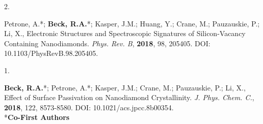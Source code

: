\begin{cvpublications}



\cvpublication
{2.}
{\parbox[t]{0.95\textwidth}{\strut Petrone, A.*; \textbf{Beck, R.A.}*; Kasper, J.M.; Huang, Y.; Crane, M.; Pauzauskie, P.; Li, X., 
Electronic Structures and Spectroscopic Signatures of Silicon-Vacancy Containing Nanodiamonds.
\textit{Phys. Rev. B}, \textbf{2018}, 98, 205405.
DOI: 10.1103/PhysRevB.98.205405.}}




\cvpublication
{1.}
{\parbox[t]{0.95\textwidth}{\strut \textbf{Beck, R.A.}*; Petrone, A.*; Kasper, J.M.; Crane, M.; Pauzauskie, P.; Li, X., 
Effect of Surface Passivation on Nanodiamond Crystallinity.
\textit{J. Phys. Chem. C.}, \textbf{2018}, 122, 8573-8580.
DOI: 10.1021/acs.jpcc.8b00354. \\ \**\textbf{Co-First Authors}}}



\end{cvpublications}
